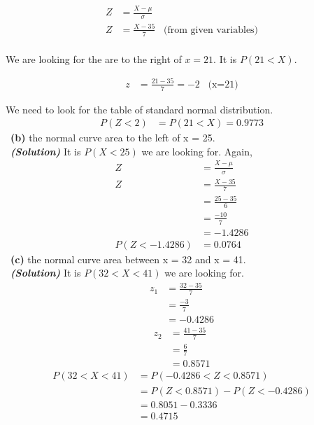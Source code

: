 \documentclass[a4 paper]{article}
\numberwithin{equation}{section}
\newcommand{\subproblem}[1]{~\newline\textbf{(#1)}}
\newcommand{\solution}{~\newline\textbf{\textit{(Solution)}} }
\newcommand{\0}{\mathbf{0}}
\begin{document}
\begin{align*}
    Z &= \frac{X-\mu}{\sigma} \\
    Z &= \frac{X-35}{7} \;\;\; \text{(from given variables)}\\
\end{align*}

We are looking for the are to the right of $x=21$. It is $P(21<X)$.

\begin{align*}
    z &= \frac{21-35}{7} = -2 \;\;\; \text{(x=21)}
\end{align*}

We need to look for the table of standard normal distribution.
\begin{align*}
    P(Z<2) &= P(21<X) = 0.9773
\end{align*}
\newline
\subproblem{b}  the normal curve area to the left of x = 25.\\
\solution
It is $P(X<25)$ we are looking for. Again,
\begin{align*}
    Z &= \frac{X-\mu}{\sigma} \\
    Z &= \frac{X-35}{7} \\
     &= \frac{25-35}{6} \\
     &= \frac{-10}{7} \\
     &= -1.4286 \\
    P(Z<-1.4286) &= 0.0764
\end{align*}
\newline
\subproblem{c}  the normal curve area between x = 32 and x = 41.\\
\solution 
It is $P (32 < X < 41)$ we are looking for.
\begin{align*}
    z_1 &= \frac{32-35}{7}\\
    &= \frac{-3}{7} \\
    &= -0.4286
\end{align*}
\begin{align*}
    z_2 &= \frac{41-35}{7}\\
    &= \frac{6}{7} \\
    &= 0.8571
\end{align*}
\begin{align*}
    P(32<X<41) &= P (−0.4286 < Z < 0.8571) \\
    &= P (Z < 0.8571) − P (Z < −0.4286) \\
    &= 0.8051 − 0.3336 \\
    &= 0.4715
\end{align*}
\newline
\end{document}
